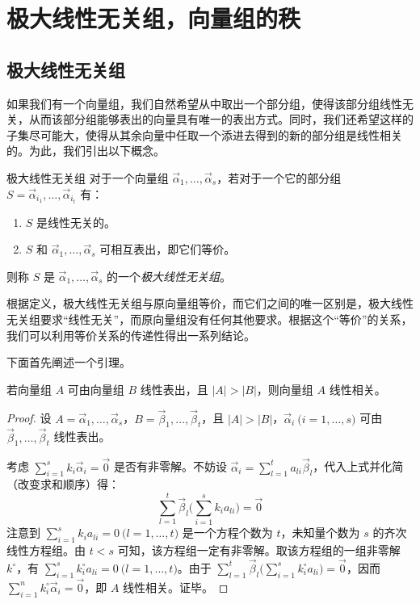 
\section{极大线性无关组，向量组的秩}

\subsection{极大线性无关组}

如果我们有一个向量组，我们自然希望从中取出一个部分组，使得该部分组线性无关，从而该部分组能够表出的向量具有唯一的表出方式。同时，我们还希望这样的子集尽可能大，使得从其余向量中任取一个添进去得到的新的部分组是线性相关的。为此，我们引出以下概念。

\begin{definition}{极大线性无关组}
	对于一个向量组 $\vec \alpha_1, \ldots, \vec \alpha_s$，若对于一个它的部分组 $S = \vec \alpha_{i_1}, \ldots, \vec \alpha_{i_t}$ 有：

	\begin{enumerate}
		\item $S$ 是线性无关的。
		\item $S$ 和 $\vec \alpha_1, \ldots, \vec \alpha_s$ 可相互表出，即它们等价。
	\end{enumerate}

	则称 $S$ 是 $\vec \alpha_1, \ldots, \vec \alpha_s$ 的一个\emph{极大线性无关组}。
\end{definition}

根据定义，极大线性无关组与原向量组等价，而它们之间的唯一区别是，极大线性无关组要求“线性无关”，而原向量组没有任何其他要求。根据这个“等价”的关系，我们可以利用等价关系的传递性得出一系列结论。

下面首先阐述一个引理。

\begin{theorem}
	若向量组 $A$ 可由向量组 $B$ 线性表出，且 $|A| > |B|$，则向量组 $A$ 线性相关。
\end{theorem}

\begin{proof}
	设 $A = \vec \alpha_1, \ldots, \vec \alpha_s$，$B = \vec \beta_1, \ldots, \vec \beta_t$，且 $|A| > |B|$，$\vec \alpha_i \pod{i = 1, \ldots, s}$ 可由 $\vec \beta_1, \ldots, \vec \beta_t$ 线性表出。

	考虑 $\sum\limits_{i = 1}^s k_i \vec \alpha_i = \vec 0$ 是否有非零解。不妨设 $\vec \alpha_i = \sum\limits_{l = 1}^t a_{li} \vec \beta_l$，代入上式并化简（改变求和顺序）得：
	$$
	\sum_{l = 1}^t \vec \beta_l \biggl( \sum_{i = 1}^s k_i a_{li} \biggr) = \vec 0
	$$
	注意到 $\sum\limits_{i = 1}^s k_i a_{li} = 0 \pod{l = 1, \ldots, t}$ 是一个方程个数为 $t$，未知量个数为 $s$ 的齐次线性方程组。由 $t < s$ 可知，该方程组一定有非零解。取该方程组的一组非零解 $k^\circ$，有 $\sum\limits_{i = 1}^s k^\circ_i a_{li} = 0 \pod{l = 1, \ldots, t}$。由于 $\sum\limits_{l = 1}^t \vec \beta_l \biggl( \sum\limits_{i = 1}^s k^\circ_i a_{li} \biggr) = \vec 0$，因而 $\sum\limits_{i = 1}^n k^\circ_i \vec \alpha_i = \vec 0$，即 $A$ 线性相关。证毕。
\end{proof}

